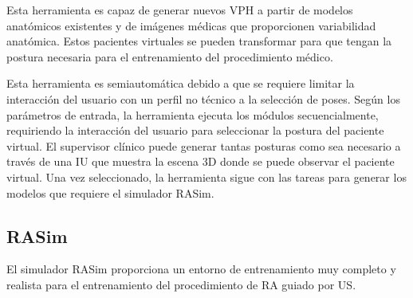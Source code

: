 Esta herramienta es capaz de generar nuevos \ac{VPH} a partir de modelos  anatómicos  existentes y de imágenes médicas que proporcionen variabilidad anatómica. Estos pacientes virtuales se pueden transformar para que tengan la postura necesaria para el entrenamiento del procedimiento médico. %

Esta herramienta es semiautomática debido a que se requiere limitar la interacción del usuario con un perfil no técnico a la selección de poses. Según los parámetros de entrada, la herramienta ejecuta los módulos secuencialmente, requiriendo la interacción del usuario para seleccionar la postura del paciente virtual. El supervisor clínico puede generar tantas posturas como sea necesario a través de una \ac{IU} que muestra la escena 3D donde se puede observar el paciente virtual. Una vez seleccionado, la herramienta sigue con las tareas para generar los modelos que requiere el simulador \ac{RASim}.


\subsection{RASim}
\label{conclu:rasim}
El simulador \ac{RASim} proporciona un entorno de entrenamiento muy completo y realista para el entrenamiento del procedimiento de \ac{RA} guiado por \ac{US}.

